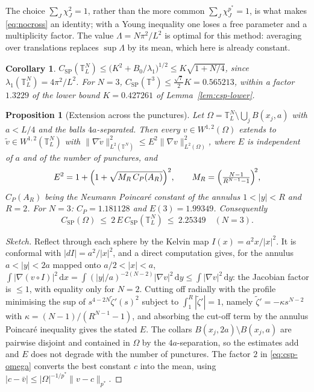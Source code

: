 \documentclass[11pt,reqno]{amsart}
\theoremstyle{plain}
\newtheorem{proposition}[theorem]{Proposition}
\newtheorem{corollary}[theorem]{Corollary}
\theoremstyle{definition}
\newcommand{\Tor}{\mathbb{T}}
\newcommand{\pstar}{p^{*}}
\newcommand{\Ksob}{K}
\newcommand{\Csp}{C_{\mathrm{SP}}}
\newcommand{\dd}{\,\mathrm{d}}
\begin{document}
The choice $\sum_J\chi_J^2=1$, rather than the more common
$\sum_J\chi_J^{\pstar}=1$, is what makes \eqref{eq:nocross} an identity; with a
Young inequality one loses a free parameter and a multiplicity factor. The value
$\Lambda=N\pi^2/L^2$ is optimal for this method: averaging over translations
replaces $\sup\Lambda$ by its mean, which here is already constant.

\begin{corollary}
\label{cor:csp-torus}
$\Csp(\Tor^N_L)\le\bigl(\Ksob^2+B_0/\lambda_1\bigr)^{1/2}\le\Ksob\sqrt{1+N/4}$,
since $\lambda_1(\Tor^N_L)=4\pi^2/L^2$. For $N=3$,
$\Csp(\Tor^3)\le\tfrac{\sqrt7}{2}\Ksob=0.565213$, within a factor $1.3229$ of the
lower bound $\Ksob=0.427261$ of Lemma~\ref{lem:csp-lower}.
\end{corollary}

\begin{proposition}[Extension across the punctures]
\label{prop:extension}
Let $\Omega=\Tor^N_L\setminus\bigcup_{j}B(x_j,a)$ with $a<L/4$ and the balls
$4a$-separated. Then every $v\in W^{1,2}(\Omega)$ extends to
$\tilde v\in W^{1,2}(\Tor^N_L)$ with
$\|\nabla\tilde v\|^2_{L^2(\Tor^N)}\le E^2\|\nabla v\|^2_{L^2(\Omega)}$, where
$E$ is independent of $a$ and of the number of punctures, and
\[
   E^2=1+\Bigl(1+\sqrt{M_R\,C_P(A_R)}\Bigr)^2,\qquad
   M_R=\Bigl(\tfrac{N-1}{R^{N-1}-1}\Bigr)^{\!2},
\]
$C_P(A_R)$ being the Neumann Poincaré constant of the annulus $1<|y|<R$ and
$R=2$. For $N=3$: $C_P=1.181128$ and $E(3)=1.99349$. Consequently
\begin{equation}
\label{eq:csp-omega}
  \Csp(\Omega)\ \le\ 2\,E\,\Csp(\Tor^N_L)\ \le\ 2.25349\quad(N=3).
\end{equation}
\end{proposition}

\begin{proof}[Sketch]
Reflect through each sphere by the Kelvin map $I(x)=a^2x/|x|^2$. It is conformal
with $|dI|=a^2/|x|^2$, and a direct computation gives, for the annulus
$a<|y|<2a$ mapped onto $a/2<|x|<a$,
$\int|\nabla(v\circ I)|^2\dd x=\int(|y|/a)^{-2(N-2)}|\nabla v|^2\dd y
 \le\int|\nabla v|^2\dd y$: the Jacobian factor is $\le1$, with equality only for
$N=2$. Cutting off radially with the profile minimising the sup of
$s^{4-2N}\tilde\zeta'(s)^2$ subject to $\int_1^R|\tilde\zeta'|=1$, namely
$\tilde\zeta'=-\kappa s^{N-2}$ with $\kappa=(N-1)/(R^{N-1}-1)$, and absorbing the
cut-off term by the annulus Poincaré inequality gives the stated $E$. The collars
$B(x_j,2a)\setminus B(x_j,a)$ are pairwise disjoint and contained in $\Omega$ by
the $4a$-separation, so the estimates add and $E$ does not degrade with the number
of punctures. The factor $2$ in \eqref{eq:csp-omega} converts the best constant
$c$ into the mean, using $|c-\bar v|\le|\Omega|^{-1/\pstar}\|v-c\|_{\pstar}$.
\end{proof}
\end{document}
